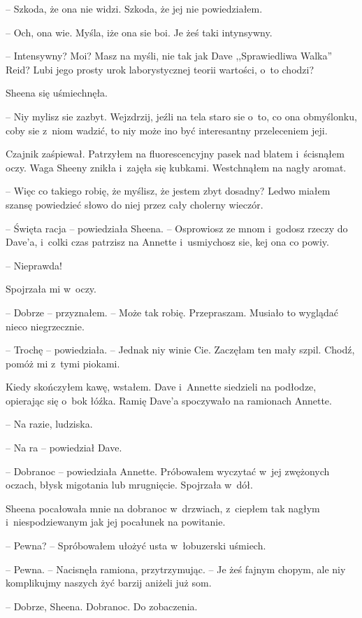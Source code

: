 \documentclass[oneside,polish,11pt,sfheadings]{mwbk}
\begin{document}
-- Szkoda, że ona nie widzi. Szkoda, że jej nie powiedziałem.

-- Och, ona wie. Myśla, iże ona sie boi. Je żeś taki intynsywny.

-- Intensywny? Moi? Masz na myśli, nie tak jak Dave ,,Sprawiedliwa Walka''
Reid? Lubi jego prosty urok laborystycznej teorii wartości, o~to chodzi?

Sheena się uśmiechnęła. 

-- Niy mylisz sie zazbyt. Wejzdrzij, jeźli na
tela staro sie o~to, co ona obmyślonku, coby sie z~niom wadzić, to niy
może ino być interesantny przeleceniem jeji.

Czajnik zaśpiewał. Patrzyłem na fluorescencyjny pasek nad blatem i~ścisnąłem oczy. Waga Sheeny znikła i~zajęła się kubkami. Westchnąłem na
nagły aromat.

-- Więc co takiego robię, że myślisz, że jestem zbyt dosadny? Ledwo
miałem szansę powiedzieć słowo do niej przez cały cholerny wieczór.

-- Święta racja -- powiedziała Sheena. -- Osprowiosz ze mnom i~godosz
rzeczy do Dave'a, i~colki czas patrzisz na Annette i~usmiychosz sie, kej
ona co powiy.

-- Nieprawda!

Spojrzała mi w~oczy.

-- Dobrze -- przyznałem. -- Może tak robię. Przepraszam. Musiało to
wyglądać nieco niegrzecznie.

-- Trochę -- powiedziała. -- Jednak niy winie Cie. Zaczęłam ten mały szpil.
Chodź, pomóż mi z~tymi piokami.

Kiedy skończyłem kawę, wstałem. Dave i~Annette siedzieli na podłodze,
opierając się o~bok łóźka. Ramię Dave'a spoczywało na ramionach Annette.

-- Na razie, ludziska.

-- Na ra -- powiedział Dave.

-- Dobranoc -- powiedziała Annette. Próbowałem wyczytać w~jej zwężonych
oczach, błysk migotania lub mrugnięcie. Spojrzała w~dół.

Sheena pocałowała mnie na dobranoc w~drzwiach, z~ciepłem tak nagłym i~niespodziewanym jak jej pocałunek na powitanie.

-- Pewna? -- Spróbowałem ułożyć usta w~łobuzerski uśmiech.

-- Pewna. -- Nacisnęła ramiona, przytrzymując. -- Je żeś fajnym chopym, ale
niy komplikujmy naszych żyć barzij aniżeli już som.

-- Dobrze, Sheena. Dobranoc. Do zobaczenia.
\end{document}
